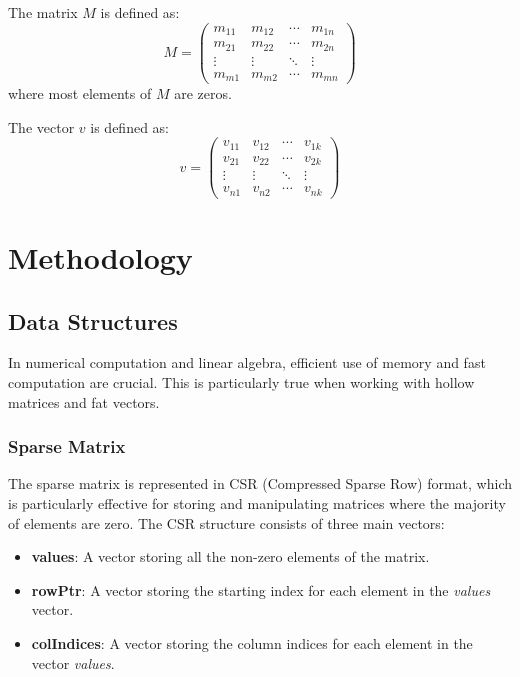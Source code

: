 \documentclass[12pt,oneside]{book} %
\begin{document}
The matrix $M$ is defined as:
\begin{equation}
    M = \begin{pmatrix}
        m_{11} & m_{12} & \cdots & m_{1n} \\
        m_{21} & m_{22} & \cdots & m_{2n} \\
        \vdots & \vdots & \ddots & \vdots \\
        m_{m1} & m_{m2} & \cdots & m_{mn}
    \end{pmatrix}
\end{equation}\label{eq:sparse-matrix}
where most elements of $M$ are zeros.

The vector $v$ is defined as:
\begin{equation}
    v = \begin{pmatrix}
        v_{11} & v_{12} & \cdots & v_{1k} \\
        v_{21} & v_{22} & \cdots & v_{2k} \\
        \vdots & \vdots & \ddots & \vdots \\
        v_{n1} & v_{n2} & \cdots & v_{nk}
    \end{pmatrix}\label{eq:fat-vector}
\end{equation}

\chapter{Methodology}
\section{Data Structures}
In numerical computation and linear algebra, efficient use of memory and fast
computation are crucial. This is particularly true when working with hollow
matrices and fat vectors.

\subsection{Sparse Matrix}
The sparse matrix is represented in CSR (Compressed Sparse Row) format, which
is particularly effective for storing and manipulating matrices where the
majority of elements are zero. The CSR structure consists of three main
vectors:
\begin{itemize}
    \item \textbf{values}: A vector storing all the non-zero elements of the matrix.
    \item \textbf{rowPtr}: A vector storing the starting index for each element in the
          \textit{values} vector.
    \item \textbf{colIndices}: A vector storing the column indices for each element in the vector \textit{values}.
          \
\end{itemize}
\end{document}
